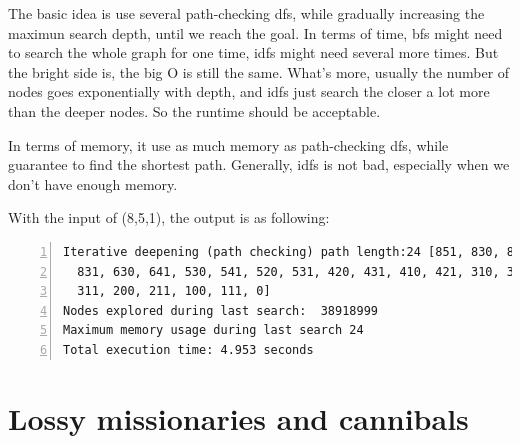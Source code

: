 \documentclass{article}
\begin{document}
The basic idea is use several path-checking dfs, while gradually increasing the maximun search depth, until we reach the goal. In terms of time, bfs might need to search the whole graph for one time, idfs might need several more times. But the bright side is, the big O is still the same. What's more, usually the number of nodes goes exponentially with depth, and idfs just search the closer a lot more than the deeper nodes. So the runtime should be acceptable.

In terms of memory, it use as much memory as path-checking dfs, while guarantee to find the shortest path. Generally, idfs is not bad, especially when we don't have enough memory.

With the input of (8,5,1), the output is as following:

\begin{lstlisting}[numbers=left]
Iterative deepening (path checking) path length:24 [851, 830, 841, 820,
  831, 630, 641, 530, 541, 520, 531, 420, 431, 410, 421, 310, 321, 300,
  311, 200, 211, 100, 111, 0]
Nodes explored during last search:  38918999
Maximum memory usage during last search 24
Total execution time: 4.953 seconds
\end{lstlisting}






\section{Lossy missionaries and cannibals}
\end{document}
